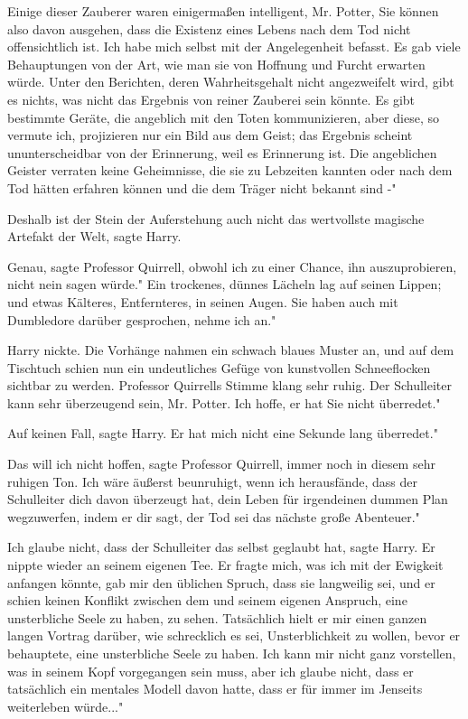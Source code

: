 \glqq Einige dieser Zauberer waren einigermaßen intelligent, Mr. Potter, Sie
können also davon ausgehen, dass die Existenz eines Lebens nach dem Tod nicht
offensichtlich ist. Ich habe mich selbst mit der Angelegenheit befasst. Es gab
viele Behauptungen von der Art, wie man sie von Hoffnung und Furcht erwarten
würde. Unter den Berichten, deren Wahrheitsgehalt nicht angezweifelt wird, gibt
es nichts, was nicht das Ergebnis von reiner Zauberei sein könnte. Es gibt
bestimmte Geräte, die angeblich mit den Toten kommunizieren, aber diese, so
vermute ich, projizieren nur ein Bild aus dem Geist; das Ergebnis scheint
ununterscheidbar von der Erinnerung, weil es Erinnerung ist. Die angeblichen
Geister verraten keine Geheimnisse, die sie zu Lebzeiten kannten oder nach dem
Tod hätten erfahren können und die dem Träger nicht bekannt sind -"

\glqq Deshalb ist der Stein der Auferstehung auch nicht das wertvollste magische
Artefakt der Welt\grqq{}, sagte Harry.

\glqq Genau\grqq{}, sagte Professor Quirrell, \glqq obwohl ich zu einer Chance,
ihn auszuprobieren, nicht nein sagen würde." Ein trockenes, dünnes Lächeln lag
auf seinen Lippen; und etwas Kälteres, Entfernteres, in seinen Augen. \glqq Sie
haben auch mit Dumbledore darüber gesprochen, nehme ich an."

Harry nickte. Die Vorhänge nahmen ein schwach blaues Muster an, und auf dem
Tischtuch schien nun ein undeutliches Gefüge von kunstvollen Schneeflocken
sichtbar zu werden. Professor Quirrells Stimme klang sehr ruhig. \glqq Der
Schulleiter kann sehr überzeugend sein, Mr. Potter. Ich hoffe, er hat Sie nicht
überredet."

\glqq Auf keinen Fall\grqq{}, sagte Harry. \glqq Er hat mich nicht eine Sekunde
lang überredet."

\glqq Das will ich nicht hoffen\grqq{}, sagte Professor Quirrell, immer noch in
diesem sehr ruhigen Ton. \glqq Ich wäre äußerst beunruhigt, wenn ich
herausfände, dass der Schulleiter dich davon überzeugt hat, dein Leben für
irgendeinen dummen Plan wegzuwerfen, indem er dir sagt, der Tod sei das nächste
große Abenteuer."

\glqq Ich glaube nicht, dass der Schulleiter das selbst geglaubt hat\grqq{},
sagte Harry. Er nippte wieder an seinem eigenen Tee. \glqq Er fragte mich, was
ich mit der Ewigkeit anfangen könnte, gab mir den üblichen Spruch, dass sie
langweilig sei, und er schien keinen Konflikt zwischen dem und seinem eigenen
Anspruch, eine unsterbliche Seele zu haben, zu sehen. Tatsächlich hielt er mir
einen ganzen langen Vortrag darüber, wie schrecklich es sei, Unsterblichkeit zu
wollen, bevor er behauptete, eine unsterbliche Seele zu haben. Ich kann mir
nicht ganz vorstellen, was in seinem Kopf vorgegangen sein muss, aber ich glaube
nicht, dass er tatsächlich ein mentales Modell davon hatte, dass er für immer im
Jenseits weiterleben würde..."

